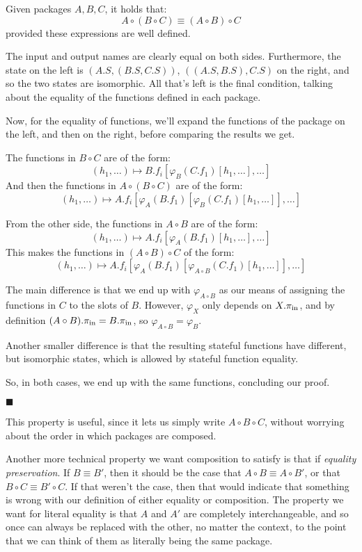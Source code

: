 \begin{lemma}
    Given packages $A, B, C$, it holds that:
    $$
    A \circ (B \circ C) \equiv (A \circ B) \circ C
    $$
    provided these expressions are well defined.

     The input and output names are clearly equal on both sides.
    Furthermore, the state on the left is $(A.S, (B.S, C.S))$,
    $((A.S, B.S), C.S)$ on the right, and so the two states are isomorphic.
    All that's left is the final condition, talking about the equality
    of the functions defined in each package.

    Now, for the equality of functions, we'll expand the functions
    of the package on the left, and then on the right, before comparing
    the results we get.

    The functions in $B \circ C$ are of the form:
    $$
    (h_1, \ldots) \mapsto B.f_i[\varphi_{B}(C.f_1)[h_1, \ldots], \ldots]
    $$
    And then the functions in $A \circ (B \circ C)$ are of the form:
    $$
    (h_1, \ldots) \mapsto A.f_i[\varphi_{A}(B.f_1)[\varphi_{B}(C.f_1)[h_1, \ldots]], \ldots]
    $$

    From the other side, the functions in $A \circ B$ are of the form:
    $$
    (h_1, \ldots) \mapsto A.f_i[\varphi_{A}(B.f_1)[h_1, \ldots], \ldots]
    $$
    This makes the functions in $(A \circ B) \circ C$ of the form:
    $$
    (h_1, \ldots) \mapsto A.f_i[\varphi_{A}(B.f_1)[\varphi_{A \circ B}(C.f_1)[h_1, \ldots]], \ldots]
    $$

    The main difference is that we end up with $\varphi_{A \circ B}$
    as our means of assigning the functions in $C$ to the slots
    of $B$.
    However, $\varphi_{X}$ only depends on $X.\pi_{\text{in}}$,
    and by definition $(A \circ B).\pi_{\text{in}} = B.\pi_{\text{in}}$,
    so $\varphi_{A \circ B} = \varphi_B$.

    Another smaller difference is that the resulting stateful functions
    have different, but isomorphic states, which is allowed
    by stateful function equality.

    So, in both cases, we end up with the same functions, concluding
    our proof.

    $\blacksquare$
\end{lemma}

This property is useful, since it lets us simply write $A \circ B \circ C$,
without worrying about the order in which packages are composed.

Another more technical property we want composition to satisfy is
that if \emph{equality preservation}.
If $B \equiv B'$, then it should be the case that $A \circ B \equiv A \circ B'$,
or that $B \circ C \equiv B' \circ C$.
If that weren't the case, then that would indicate that something is wrong
with our definition of either equality or composition.
The property we want for literal equality is that $A$ and $A'$ are completely
interchangeable, and so once can always be replaced with the other, no matter
the context, to the point that we can think of them as literally being the same
package.

